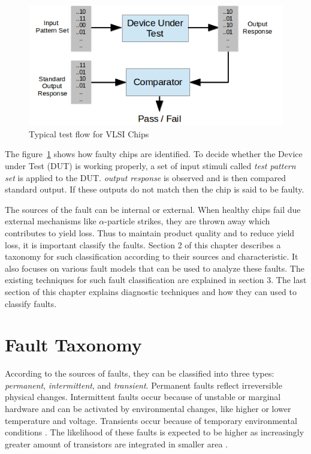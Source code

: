\begin{figure}[h]
  \begin{center}
    \captionsetup{justification=centering}
    \includegraphics[scale=0.75]{figures/vlsitesting.png}
    \caption{Typical test flow for VLSI Chips}
    \label{fig:vlsitesting}
  \end{center}
\end{figure}

The figure~\ref{fig:vlsitesting} shows how faulty chips are identified. To decide whether the Device under Test (DUT) is working properly, a set of input stimuli called \emph{test pattern set} is applied to the DUT. \emph{output response} is observed and is then compared standard output. If these outputs do not match then the chip is said to be faulty.

The sources of the fault can be internal or external. When healthy chips fail due external mechanisms like $\alpha$-particle strikes, they are thrown away which contributes to yield loss. Thus to maintain product quality and to reduce yield loss, it is important classify the faults. Section 2 of this chapter describes a taxonomy for such classification according to their sources and characteristic. It also focuses on various fault models that can be used to analyze these faults. The existing techniques for such fault classification are explained in section 3. The last section of this chapter explains diagnostic techniques and how they can used to classify faults.

\section{Fault Taxonomy}
\label{sec:secft}
According to the sources of faults, they can be classified into three types: \emph{permanent}, \emph{intermittent}, and \emph{transient}. Permanent faults reflect irreversible physical changes. Intermittent faults occur because of unstable or marginal hardware and can be activated by environmental changes, like higher or lower temperature and voltage. Transients occur because of temporary environmental conditions \cite{Constantinescu2003}. The likelihood of these faults is expected to be higher as increasingly greater amount of transistors are integrated in smaller area \cite{Constantinescu2007}.

